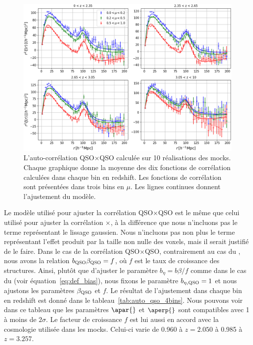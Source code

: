 \begin{figure}
  \centering
  \includegraphics[scale=0.4]{auto_qso_4bins}
  \caption{L'auto-corrélation QSO$\times$QSO calculée sur 10 réalisations des mocks. Chaque graphique donne la moyenne des dix fonctions de corrélation calculées dans chaque bin en redshift. Les fonctions de corrélation sont présentées dans trois bins en $\mu$. Les lignes continues donnent l'ajustement du modèle.}
  \label{fig:auto_qso_4bins}
\end{figure}

Le modèle utilisé pour ajuster la corrélation QSO$\times$QSO est le même que celui utilisé pour ajuster la corrélation \lya{}$\times$\lya{}, à la différence que nous n'incluons pas le terme représentant le lissage gaussien. %
Nous n'incluons pas non plus le terme représentant l'effet produit par la taille non nulle des voxels, mais il serait justifié de le faire.
Dans le cas de la corrélation QSO$\times$QSO, contrairement au cas du \lya{}, nous avons la relation $b_{\textsc{QSO}} \beta_{\textsc{QSO}} = f$, où $f$ est le taux de croissance des structures.
Ainsi, plutôt que d'ajuster le paramètre $b_{\eta} = b \beta / f$ comme dans le cas du \lya{} (voir équation~\ref{eq:def_bias}), nous fixons le paramètre $b_{\eta, \textsc{QSO}} = 1$ et nous ajustons les paramètres $\beta_{\textsc{QSO}}$ et $f$.
Le résultat de l'ajustement dans chaque bin en redshift est donné dans le tableau~\ref{tab:auto_qso_4bins}.
Nous pouvons voir dans ce tableau que les paramètres $\apar{}$ et $\aperp{}$ sont compatibles avec 1 à moins de $2 \sigma $.
Le facteur de croissance $f$ est lui aussi en accord avec la cosmologie utilisée dans les mocks. Celui-ci varie de \num{0.960} à $z=\num{2.050}$ à \num{0.985} à $z=\num{3.257}$.

